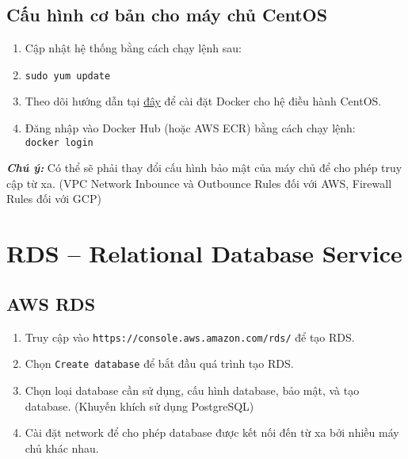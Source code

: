 \subsection{Cấu hình cơ bản cho máy chủ CentOS}
\begin{enumerate}
\item Cập nhật hệ thống bằng cách chạy lệnh sau:
\item \texttt{sudo yum update}
\item Theo dõi hướng dẫn tại \href{https://docs.docker.com/engine/install/centos/}{đây} để cài đặt Docker cho hệ điều hành CentOS.
\item {Đăng nhập vào Docker Hub (hoặc AWS ECR) bằng cách chạy lệnh: \\
    \texttt{docker login}}
\end{enumerate}
\textbf{\textit{Chú ý:}} Có thể sẽ phải thay đổi cấu hình bảo mật của máy chủ để cho phép truy cập từ xa. (VPC Network Inbounce và Outbounce Rules đối với AWS, Firewall Rules đối với GCP)

\section{RDS -- Relational Database Service}
\subsection{AWS RDS}
\begin{enumerate}
\item Truy cập vào \texttt{https://console.aws.amazon.com/rds/} để tạo RDS.
\item Chọn \texttt{Create database} để bắt đầu quá trình tạo RDS.
\item Chọn loại database cần sử dụng, cấu hình database, bảo mật, và tạo database. (Khuyến khích sử dụng PostgreSQL)
\item Cài đặt network để cho phép database được kết nối đến từ xa bởi nhiều máy chủ khác nhau.
\end{enumerate}

